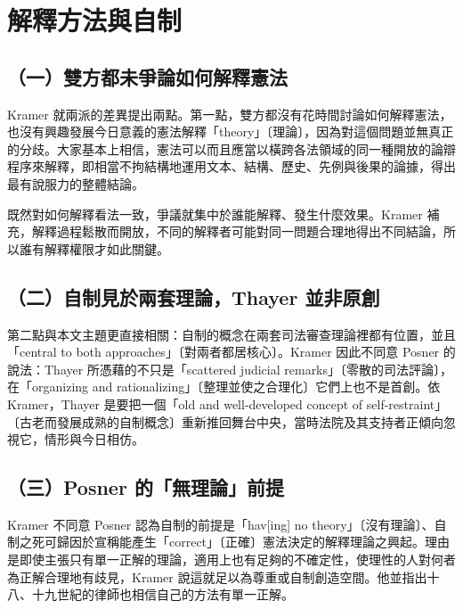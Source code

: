 \section{解釋方法與自制}
\label{sec:Kramer-3}

\subsection{（一）雙方都未爭論如何解釋憲法}

Kramer 就兩派的差異提出兩點。第一點，雙方都沒有花時間討論如何解釋憲法，也沒有興趣發展今日意義的憲法解釋「theory」〔理論〕，因為對這個問題並無真正的分歧。大家基本上相信，憲法可以而且應當以橫跨各法領域的同一種開放的論辯程序來解釋，即相當不拘結構地運用文本、結構、歷史、先例與後果的論據，得出最有說服力的整體結論。

既然對如何解釋看法一致，爭議就集中於誰能解釋、發生什麼效果。Kramer 補充，解釋過程鬆散而開放，不同的解釋者可能對同一問題合理地得出不同結論，所以誰有解釋權限才如此關鍵。

\subsection{（二）自制見於兩套理論，Thayer 並非原創}

第二點與本文主題更直接相關：自制的概念在兩套司法審查理論裡都有位置，並且「central to both approaches」〔對兩者都居核心〕。Kramer 因此不同意 Posner 的說法：Thayer 所憑藉的不只是「scattered judicial remarks」〔零散的司法評論〕，在「organizing and rationalizing」〔整理並使之合理化〕它們上也不是首創。依 Kramer，Thayer 是要把一個「old and well-developed concept of self-restraint」〔古老而發展成熟的自制概念〕重新推回舞台中央，當時法院及其支持者正傾向忽視它，情形與今日相仿。

\subsection{（三）Posner 的「無理論」前提}

Kramer 不同意 Posner 認為自制的前提是「hav{[}ing{]} no theory」〔沒有理論〕、自制之死可歸因於宣稱能產生「correct」〔正確〕憲法決定的解釋理論之興起。理由是即使主張只有單一正解的理論，適用上也有足夠的不確定性，使理性的人對何者為正解合理地有歧見，Kramer 說這就足以為尊重或自制創造空間。他並指出十八、十九世紀的律師也相信自己的方法有單一正解。

